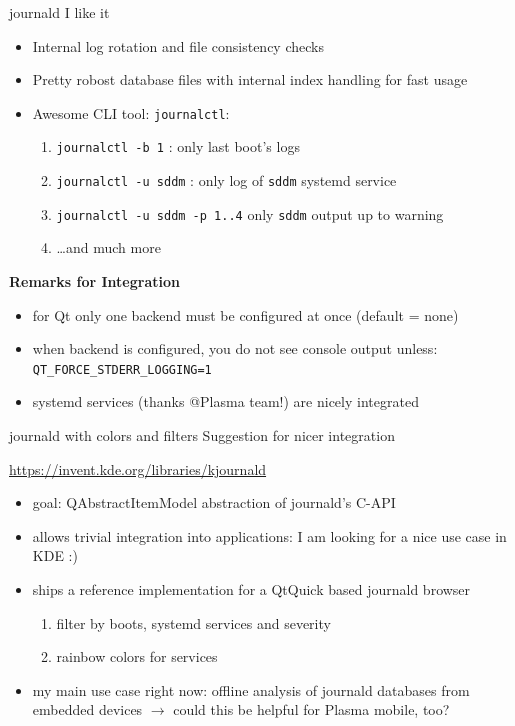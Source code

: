 \documentclass[t,compress,aspectratio=169]{beamer}
\begin{document}
\begin{frame}
    {journald}
    {I like it}

    \begin{itemize}
        \item Internal log rotation and file consistency checks
        \item Pretty robost database files with internal index handling for fast usage
        \item Awesome CLI tool: \texttt{journalctl}:
            \begin{enumerate}
                \item \texttt{journalctl -b 1} : only last boot's logs
                \item \texttt{journalctl -u sddm} : only log of \texttt{sddm} systemd service
                \item \texttt{journalctl -u sddm -p 1..4} only \texttt{sddm} output up to warning
                \item \dots and much more
            \end{enumerate}
    \end{itemize}
    \medskip

    \pause
    \textbf{Remarks for Integration}
    \begin{itemize}
        \item for Qt only one backend must be configured at once (default = none)
        \item when backend is configured, you do not see console output unless: \texttt{QT\_FORCE\_STDERR\_LOGGING=1}
        \item systemd services (thanks @Plasma team!) are nicely integrated
    \end{itemize}

\end{frame}

\begin{frame}
    {journald with colors and filters}
    {Suggestion for nicer integration}

    \url{https://invent.kde.org/libraries/kjournald}
    \begin{itemize}
        \item goal: QAbstractItemModel abstraction of journald's C-API
        \item allows trivial integration into applications: I am looking for a nice use case in KDE :)
        \item ships a reference implementation for a QtQuick based journald browser
            \begin{enumerate}
                \item filter by boots, systemd services and severity
                \item rainbow colors for services
            \end{enumerate}
        \item my main use case right now: offline analysis of journald databases from embedded devices $\rightarrow$ could this be helpful for Plasma mobile, too?
    \end{itemize}
\end{frame}
\end{document}
